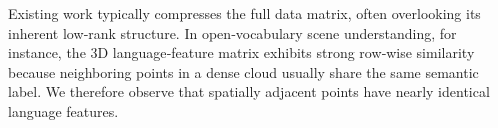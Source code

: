 \documentclass[runningheads]{llncs}
\begin{document}
Existing work typically compresses the full data matrix, often overlooking its inherent low‑rank structure. In open‑vocabulary scene understanding, for instance, the 3D language‑feature matrix exhibits strong row‑wise similarity because neighboring points in a dense cloud usually share the same semantic label. We therefore observe that spatially adjacent points have nearly identical language features.

\end{document}
